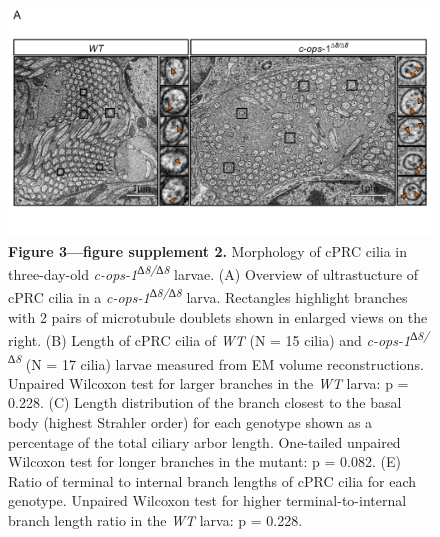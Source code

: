 \documentclass[
  11pt,
]{article}
\begin{document}
\begin{figure}[H]

{\centering \includegraphics[width=1\textwidth,height=\textheight]{Figures/Figure3-FigureSupplement2.png}

}

\caption{\textbf{Figure 3---figure supplement 2. } Morphology of cPRC
cilia in three-day-old \emph{c-ops-1\textsuperscript{∆8/∆8}} larvae. (A)
Overview of ultrastucture of cPRC cilia in a
\emph{c-ops-1\textsuperscript{∆8/∆8}} larva. Rectangles highlight
branches with 2 pairs of microtubule doublets shown in enlarged views on
the right. (B) Length of cPRC cilia of \emph{WT} (N = 15 cilia) and
\emph{c-ops-1\textsuperscript{∆8/∆8}} (N = 17 cilia) larvae measured
from EM volume reconstructions. Unpaired Wilcoxon test for larger
branches in the \emph{WT} larva: p = 0.228. (C) Length distribution of
the branch closest to the basal body (highest Strahler order) for each
genotype shown as a percentage of the total ciliary arbor length.
One-tailed unpaired Wilcoxon test for longer branches in the mutant: p =
0.082. (E) Ratio of terminal to internal branch lengths of cPRC cilia
for each genotype. Unpaired Wilcoxon test for higher
terminal-to-internal branch length ratio in the \emph{WT} larva: p =
0.228.}

\end{figure}%
\end{document}
